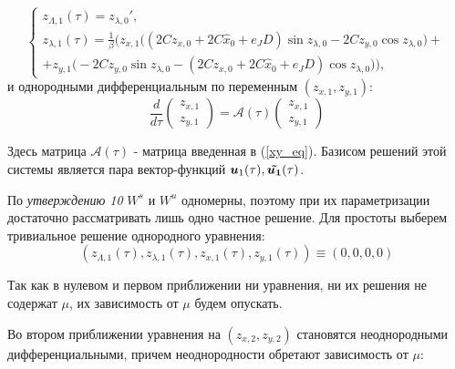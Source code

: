 \begin{equation*}
    \begin{cases}
        z_{\Lambda,1}(\tau) = z_{\lambda,0}', \\
        
        z_{\lambda,1}(\tau) = \frac1\beta \Big( z_{x,1} \big( (2Cz_{x,0}+2C \hat x_0+e_JD) \sin z_{\lambda,0} - 2C z_{y,0} \cos z_{\lambda,0} \big) + \\
        +z_{y,1} \big( -2Cz_{y,0} \sin z_{\lambda,0} - (2Cz_{x,0}+2C \hat x_0+e_JD) \cos z_{\lambda,0} \big) \Big),
    \end{cases}
\end{equation*}
и однородными дифференциальным по переменным $(z_{x,1},z_{y,1})$:
\begin{equation*}
\frac{d}{d\tau} \begin{pmatrix} z_{x,1} \\ z_{y,1} \end{pmatrix} = \mathcal{A}(\tau) \begin{pmatrix} z_{x,1} \\ z_{y,1} \end{pmatrix}
\end{equation*}

Здесь матрица $\mathcal{A}(\tau)$ - матрица введенная в (\ref{xy_eq}). Базисом решений этой системы является пара вектор-функций $\boldsymbol{u}_1 (\tau), \boldsymbol{ \tilde{u_1}} (\tau)$.

По \textit{утверждению 10} $W^s$ и $W^u$ одномерны, поэтому при их параметризации достаточно рассматривать лишь одно частное решение. Для простоты выберем тривиальное решение однородного уравнения:
$$\left(z_{\Lambda,1}(\tau), z_{\lambda,1}(\tau), z_{x,1}(\tau), z_{y,1}(\tau) \right) \equiv (0,0,0,0)$$


Так как в нулевом и первом приближении ни уравнения, ни их решения не содержат $\mu$, их зависимость от $\mu$ будем опускать.

Во втором приближении уравнения на $(z_{x,2},z_{y,2})$ становятся неоднородными дифференциальными, причем неоднородности обретают зависимость от $\mu$:

